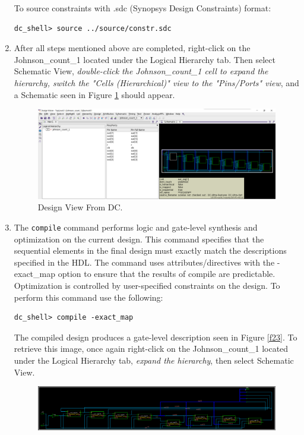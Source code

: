 \documentclass[a4paper,12pt,twoside]{article}
\begin{document}
\begin{enumerate}
    To source constraints with .sdc (Synopsys Design Constraints) format:
    \begin{verbatim}
dc_shell> source ../source/constr.sdc
    \end{verbatim}
    \item After all steps mentioned above are completed, right-click on the Johnson\_count\_1 located under the Logical Hierarchy tab. Then select Schematic View, \textit{double-click the Johnson\_count\_1 cell to expand the hierarchy, switch the "Cells (Hierarchical)" view to the "Pins/Ports" view}, and a Schematic seen in Figure \ref{f22} should appear.
    \begin{figure}[H]
        \centering
        \includegraphics[width=\textwidth]{images/22.png}
        \caption{Design View From DC.}
        \label{f22}
    \end{figure}
    \item The \texttt{compile} command performs logic and gate-level synthesis and optimization on the current design. This command specifies that the sequential elements in the final design must exactly match the descriptions specified in the HDL. The command uses attributes/directives with the -exact\_map option to ensure that the results of compile are predictable. Optimization is controlled by user-specified constraints on the design. To perform this command use the following:
    \begin{verbatim}
dc_shell> compile -exact_map
    \end{verbatim}
    The compiled design produces a gate-level description seen in Figure \ref{f23}. To retrieve this image, once again right-click on the Johnson\_count\_1 located under the Logical Hierarchy tab, \textit{expand the hierarchy}, then select Schematic View.
    \begin{figure}[H]
        \centering
        \includegraphics[width=\textwidth]{images/23.png}

\end{figure}
\end{enumerate}
\end{document}
